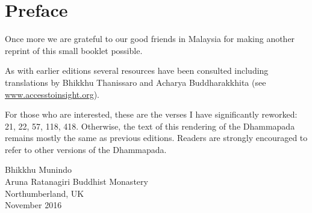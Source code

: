 \chapter[Preface to the fifth edition (2016)]{Preface}

Once more we are grateful to our good friends in Malaysia for making another
reprint of this small booklet possible.

As with earlier editions several resources have been consulted including 
translations by Bhikkhu Thanissaro and Acharya Buddharakkhita 
(see \href{http://accesstoinsight.org}{www.accesstoinsight.org}).

For those who are interested, these are the verses I have significantly
reworked: 21, 22, 57, 118, 418. Otherwise, the text of this rendering of the
Dhammapada remains mostly the same as previous editions. Readers are strongly
encouraged to refer to other versions of the Dhammapada.

{\raggedleft
Bhikkhu Munindo\\
Aruna Ratanagiri Buddhist Monastery\\
Northumberland, UK\\
November 2016
\par}
